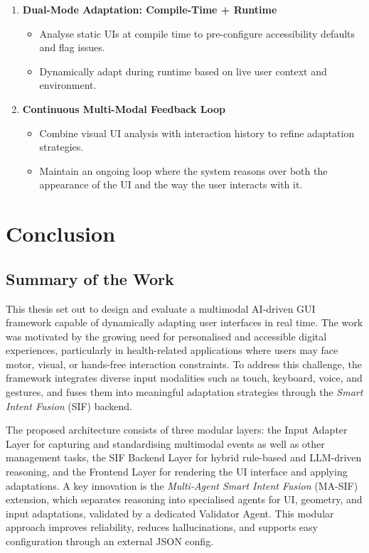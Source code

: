 \documentclass[openany]{book}
\begin{document}
\begin{enumerate}
\begin{itemize}
        \end{itemize}
    \item \textbf{Dual-Mode Adaptation: Compile-Time + Runtime}
        \begin{itemize}
            \item Analyse static UIs at compile time to pre-configure accessibility defaults and flag issues.
            \item Dynamically adapt during runtime based on live user context and environment.
        \end{itemize}
    \item \textbf{Continuous Multi-Modal Feedback Loop}
        \begin{itemize}
            \item Combine visual UI analysis with interaction history to refine adaptation strategies.
            \item Maintain an ongoing loop where the system reasons over both the appearance of the UI and the way the user interacts with it.
        \end{itemize}
\end{enumerate}




\chapter{Conclusion}

\section{Summary of the Work}
This thesis set out to design and evaluate a multimodal AI-driven GUI framework capable of dynamically adapting user interfaces in real time. 
The work was motivated by the growing need for personalised and accessible digital experiences, particularly in health-related applications where users may face motor, visual, or hands-free interaction constraints. 
To address this challenge, the framework integrates diverse input modalities such as touch, keyboard, voice, and gestures, and fuses them into meaningful adaptation strategies through the \textit{Smart Intent Fusion} (SIF) backend.

The proposed architecture consists of three modular layers: the Input Adapter Layer for capturing and standardising multimodal events as well as other management tasks, the SIF Backend Layer for hybrid rule-based and LLM-driven reasoning, and the Frontend Layer for rendering the UI interface and applying adaptations. 
A key innovation is the \textit{Multi-Agent Smart Intent Fusion} (MA-SIF) extension, which separates reasoning into specialised agents for UI, geometry, and input adaptations, validated by a dedicated Validator Agent. 
This modular approach improves reliability, reduces hallucinations, and supports easy configuration through an external JSON config.
\end{document}
